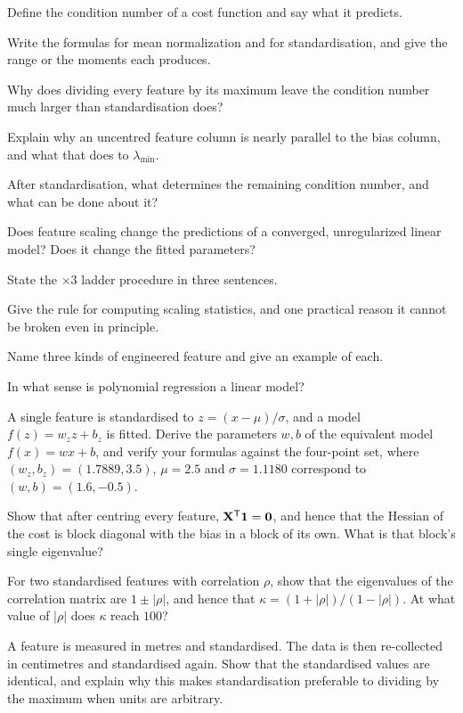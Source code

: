 
\sq Define the condition number of a cost function and say what it predicts.

\sq Write the formulas for mean normalization and for standardisation, and give
the range or the moments each produces.

\sq Why does dividing every feature by its maximum leave the condition number
much larger than standardisation does?

\sq Explain why an uncentred feature column is nearly parallel to the bias
column, and what that does to $\lambda_{\min}$.

\sq After standardisation, what determines the remaining condition number, and
what can be done about it?

\sq Does feature scaling change the predictions of a converged, unregularized
linear model? Does it change the fitted parameters?

\sq State the $\times 3$ ladder procedure in three sentences.

\sq Give the rule for computing scaling statistics, and one practical reason it
cannot be broken even in principle.

\sq Name three kinds of engineered feature and give an example of each.

\sq In what sense is polynomial regression a linear model?


\ap A single feature is standardised to $z = (x-\mu)/\sigma$, and a model
$f(z) = w_z z + b_z$ is fitted. Derive the parameters $w, b$ of the equivalent
model $f(x) = wx + b$, and verify your formulas against the four-point set, where
$(w_z, b_z) = (1.7889, 3.5)$, $\mu = 2.5$ and $\sigma = 1.1180$ correspond to
$(w,b) = (1.6,-0.5)$.

\ap Show that after centring every feature, $\mathbf{X}^{\mathsf{T}}\mathbf{1} =
\mathbf{0}$, and hence that the Hessian of the cost is block diagonal with the
bias in a block of its own. What is that block's single eigenvalue?

\ap For two standardised features with correlation $\rho$, show that the
eigenvalues of the correlation matrix are $1\pm|\rho|$, and hence that
$\kappa = (1+|\rho|)/(1-|\rho|)$. At what value of $|\rho|$ does $\kappa$ reach
$100$?

\ap A feature is measured in metres and standardised. The data is then
re-collected in centimetres and standardised again. Show that the standardised
values are identical, and explain why this makes standardisation preferable to
dividing by the maximum when units are arbitrary.

